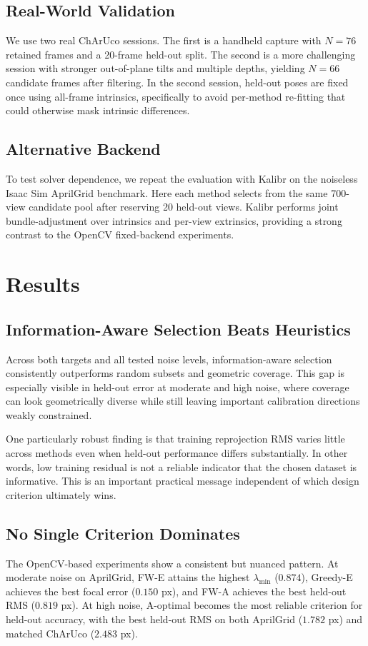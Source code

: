 \documentclass[11pt]{article}
\begin{document}
\subsection{Real-World Validation}
We use two real ChArUco sessions. The first is a handheld capture with
$N=76$ retained frames and a 20-frame held-out split. The second is a more
challenging session with stronger out-of-plane tilts and multiple depths,
yielding $N=66$ candidate frames after filtering. In the second session,
held-out poses are fixed once using all-frame intrinsics, specifically to avoid
per-method re-fitting that could otherwise mask intrinsic differences.

\subsection{Alternative Backend}
To test solver dependence, we repeat the evaluation with Kalibr on the noiseless
Isaac Sim AprilGrid benchmark. Here each method selects from the same 700-view
candidate pool after reserving 20 held-out views. Kalibr performs joint
bundle-adjustment over intrinsics and per-view extrinsics, providing a strong
contrast to the OpenCV fixed-backend experiments.

\section{Results}
\subsection{Information-Aware Selection Beats Heuristics}
Across both targets and all tested noise levels, information-aware selection
consistently outperforms random subsets and geometric coverage. This gap is
especially visible in held-out error at moderate and high noise, where coverage
can look geometrically diverse while still leaving important calibration
directions weakly constrained.

One particularly robust finding is that training reprojection RMS varies little
across methods even when held-out performance differs substantially. In other
words, low training residual is not a reliable indicator that the chosen dataset
is informative. This is an important practical message independent of which
design criterion ultimately wins.

\subsection{No Single Criterion Dominates}
The OpenCV-based experiments show a consistent but nuanced pattern.
At moderate noise on AprilGrid, FW-E attains the highest
$\lambda_{\min}$ ($0.874$), Greedy-E achieves the best focal error
($0.150$ px), and FW-A achieves the best held-out RMS ($0.819$ px).
At high noise, A-optimal becomes the most reliable criterion for held-out
accuracy, with the best held-out RMS on both AprilGrid ($1.782$ px) and matched
ChArUco ($2.483$ px).
\end{document}
